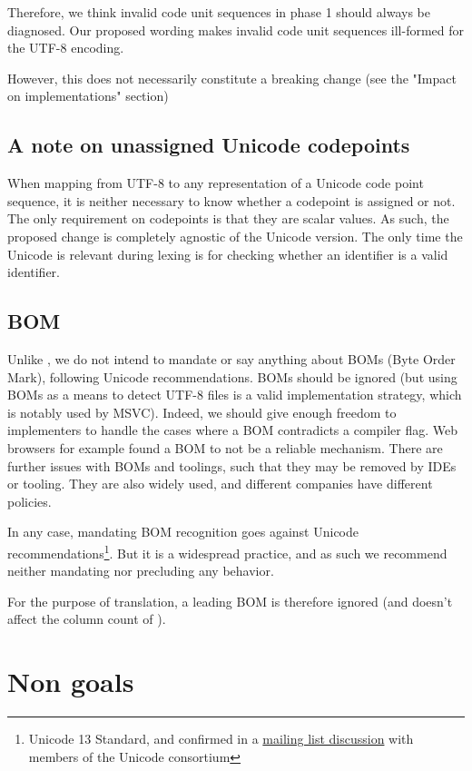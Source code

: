\documentclass{wg21}
\begin{document}
Therefore, we think invalid code unit sequences in phase 1 should always be diagnosed.
Our proposed wording makes invalid code unit sequences ill-formed for the UTF-8 encoding.

However, this does not necessarily constitute a breaking change (see the "Impact on implementations" section)

\subsection{A note on unassigned Unicode codepoints}

When mapping from UTF-8 to any representation of a Unicode code point sequence, it is neither necessary to know
whether a codepoint is assigned or not.
The only requirement on codepoints is that they are scalar values.
As such, the proposed change is completely agnostic of the Unicode version.
The only time the Unicode is relevant during lexing is for checking whether an identifier is a valid identifier.

\subsection{BOM}

Unlike , we do not intend to mandate or say anything about BOMs (Byte Order Mark), following Unicode recommendations.
BOMs should be ignored (but using BOMs as a means to detect UTF-8 files is a valid implementation strategy, which is notably used by MSVC).
Indeed, we should give enough freedom to implementers to handle the cases where a BOM contradicts a compiler flag.
Web browsers for example found a BOM to not be a reliable mechanism.
There are further issues with BOMs and toolings, such that they may be removed by IDEs or tooling.
They are also widely used, and different companies have different policies.

In any case, mandating BOM recognition goes against Unicode recommendations\footnote{Unicode 13 Standard, and confirmed in a \href{https://corp.unicode.org/mailman/private/unicode/2020-June/008716.html}{mailing list discussion} with members of the Unicode consortium}. But it is a widespread practice, and as such we recommend neither mandating nor precluding any behavior.

For the purpose of translation, a leading BOM is therefore ignored (and doesn't affect the column count of ).

\section{Non goals}
\end{document}
